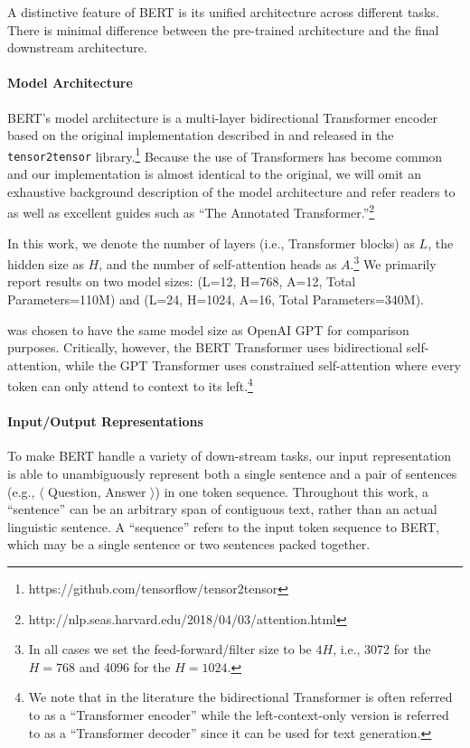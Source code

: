 A distinctive feature of BERT is its unified architecture across different tasks. There is minimal difference between the pre-trained architecture and the final downstream architecture.

\paragraph{Model Architecture} BERT's model architecture is a multi-layer bidirectional Transformer encoder based on the original implementation described in \citet{vaswani-etal:2017:_atten} and released in the {\tt tensor2tensor} library.\footnote{https://github.com/tensorflow/tensor2tensor} Because the use of Transformers has become common and our implementation is almost identical to the original, we will omit an exhaustive background description of the model architecture and refer readers to \citet{vaswani-etal:2017:_atten} as well as excellent guides such as ``The Annotated Transformer.''\footnote{http://nlp.seas.harvard.edu/2018/04/03/attention.html}

In this work, we denote the number of layers (i.e., Transformer blocks) as $L$, the hidden size as $H$, and the number of self-attention heads as $A$.\footnote{In all cases we set the feed-forward/filter size to be $4H$, i.e., 3072 for the $H=768$ and 4096 for the $H=1024$.} We primarily report results on two model sizes: {\bf \bertbase} (L=12, H=768, A=12, Total Parameters=110M) and {\bf \bertlarge} (L=24, H=1024, A=16, Total Parameters=340M).

\bertbase was chosen to have the same model size as OpenAI GPT for comparison purposes. Critically, however, the BERT Transformer uses bidirectional self-attention, while the GPT Transformer uses constrained self-attention where every token can only attend to context to its left.\footnote{We note that in the literature the bidirectional Transformer is often referred to as a ``Transformer encoder'' while the left-context-only version is referred to as a ``Transformer decoder'' since it can be used for text generation.} 

\paragraph{Input/Output Representations} To make BERT handle a variety of down-stream tasks, our input representation is able to unambiguously represent both a single sentence and a pair of  sentences (e.g., $\langle$ Question, Answer $\rangle$) in one token sequence. Throughout this work, a ``sentence'' can be an arbitrary span of contiguous text, rather than an actual linguistic sentence. A ``sequence'' refers to the input token sequence to BERT, which may be a single sentence or two sentences packed together.

